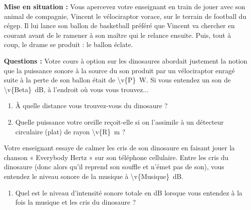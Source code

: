 
\textbf{Mise en situation :} Vous apercevez votre enseignant en train de jouer avec son animal de compagnie, Vincent le vélociraptor vorace, sur le terrain de football du cégep. Il lui lance son ballon de basketball préféré que Vincent va chercher en courant avant de le ramener à son maître qui le relance ensuite. Puis, tout à coup, le drame se produit : le ballon éclate.

\textbf{Questions :} Votre cours à option sur les dinosaures abordait justement la notion que la puissance sonore à la source du son produit par un vélociraptor enragé suite à la perte de son ballon était de \qty{\v{P}}{W}. Si vous entendez un son de \qty{\v{Beta}}{dB}, à l'endroit où vous vous trouvez...

\begin{enumerate}[label=\alph*)]
    \item À quelle distance vous trouvez-vous du dinosaure ?
    \item Quelle puissance votre oreille reçoit-elle si on l'assimile à un détecteur circulaire (plat) de rayon \qty{\v{R}}{m} ?
\end{enumerate}

Votre enseignant essaye de calmer les cris de son dinosaure en faisant jouer la chanson « Everybody Hertz » sur son téléphone cellulaire. Entre les cris du dinosaure (donc alors qu'il reprend son souffle et n'émet pas de son), vous entendez le niveau sonore de la musique à \qty{\v{Musique}}{dB}.

\begin{enumerate}[label= c)]
    \item Quel est le niveau d'intensité sonore totale en dB lorsque vous entendez à la fois la musique et les cris du dinosaure ?
\end{enumerate}